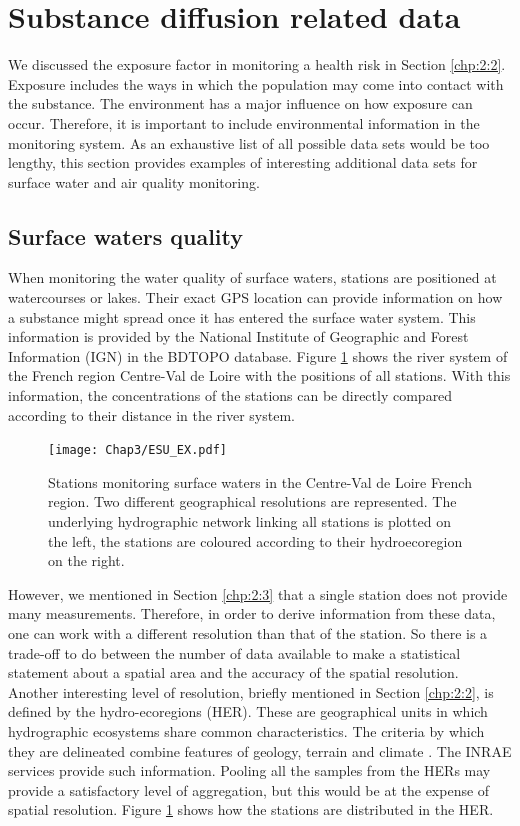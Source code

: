 \section{Substance diffusion related data}\label{chp:2:4}

We discussed the exposure factor in monitoring a health risk in Section \ref{chp:2:2}. Exposure includes the ways in which the population may come into contact with the substance. The environment has a major influence on how exposure can occur. Therefore, it is important to include environmental information in the monitoring system. As an exhaustive list of all possible data sets would be too lengthy, this section provides examples of interesting additional data sets for surface water and air quality monitoring.

\subsection{Surface waters quality}

When monitoring the water quality of surface waters, stations are positioned at watercourses or lakes. Their exact GPS location can provide information on how a substance might spread once it has entered the surface water system. This information is provided by the National Institute of Geographic and Forest Information (IGN) in the BDTOPO database. Figure \ref{fig:esu_ex} shows the river system of the French region Centre-Val de Loire with the positions of all stations. With this information, the concentrations of the stations can be directly compared according to their distance in the river system. 

\begin{figure}[ht]
    \centering
    \texttt{[image: Chap3/ESU\_EX.pdf]}
    \caption{Stations monitoring surface waters in the Centre-Val de Loire French region. Two different geographical resolutions are represented. The underlying hydrographic network linking all stations is plotted on the left, the stations are coloured according to their hydroecoregion on the right.}
    \label{fig:esu_ex}
\end{figure}

However, we mentioned in Section \ref{chp:2:3} that a single station does not provide many measurements. Therefore, in order to derive information from these data, one can work with a different resolution than that of the station. So there is a trade-off to do between the number of data available to make a statistical statement about a spatial area and the accuracy of the spatial resolution. Another interesting level of resolution, briefly mentioned in Section \ref{chp:2:2}, is defined by the hydro-ecoregions (HER). These are geographical units in which hydrographic ecosystems share common characteristics. The criteria by which they are delineated combine features of geology, terrain and climate \cite{wasson:hal-02580774}. The INRAE services provide such information. Pooling all the samples from the HERs may provide a satisfactory level of aggregation, but this would be at the expense of spatial resolution. Figure \ref{fig:esu_ex} shows how the stations are distributed in the HER.


